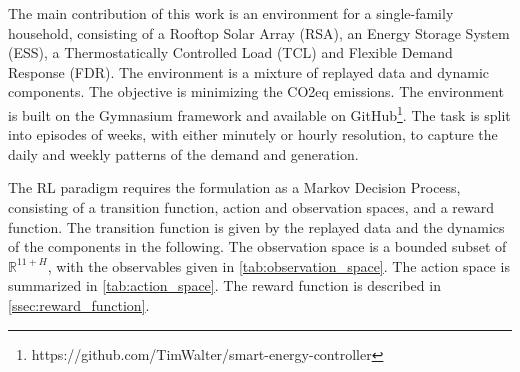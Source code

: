 The main contribution of this work is an environment for a single-family household, consisting of a Rooftop Solar Array (RSA), an Energy Storage System (ESS), a Thermostatically Controlled Load (TCL) and Flexible Demand Response (FDR). The environment is a mixture of replayed data and dynamic components. The objective is minimizing the CO2eq emissions. The environment is built on the Gymnasium framework \cite{Towers.2023} and available on GitHub\footnote{https://github.com/TimWalter/smart-energy-controller}. The task is split into episodes of weeks, with either minutely or hourly resolution, to capture the daily and weekly patterns of the demand and generation.
\par
The RL paradigm requires the formulation as a Markov Decision Process, consisting of a transition function, action and observation spaces, and a reward function. The transition function is given by the replayed data and the dynamics of the components in the following. The observation space is a bounded subset of $\mathbb{R}^{11+H}$, with the observables given in \cref{tab:observation_space}. The action space is summarized in  \cref{tab:action_space}. The reward function is described in \cref{ssec:reward_function}.

